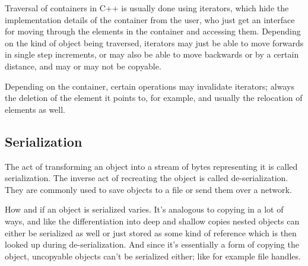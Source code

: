 		Traversal of containers in C++ is usually done using iterators, which hide the implementation details of the container from the user, who just get an interface for moving through the elements in the container and accessing them. Depending on the kind of object being traversed, iterators may just be able to move forwards in single step increments, or may also be able to move backwards or by a certain distance, and may or may not be copyable.
		
		Depending on the container, certain operations may invalidate iterators; always the deletion of the element it points to, for example, and usually the relocation of elements as well.
		
		\subsection{Serialization}
		
		The act of transforming an object into a stream of bytes representing it is called serialization. The inverse act of recreating the object is called de-serialization. They are commonly used to save objects to a file or send them over a network.
		
		How and if an object is serialized varies. It's analogous to copying in a lot of ways, and like the differentiation into deep and shallow copies nested objects can either be serialized as well or just stored as some kind of reference which is then looked up during de-serialization. And since it's essentially a form of copying the object, uncopyable objects can't be serialized either; like for example file handles.
